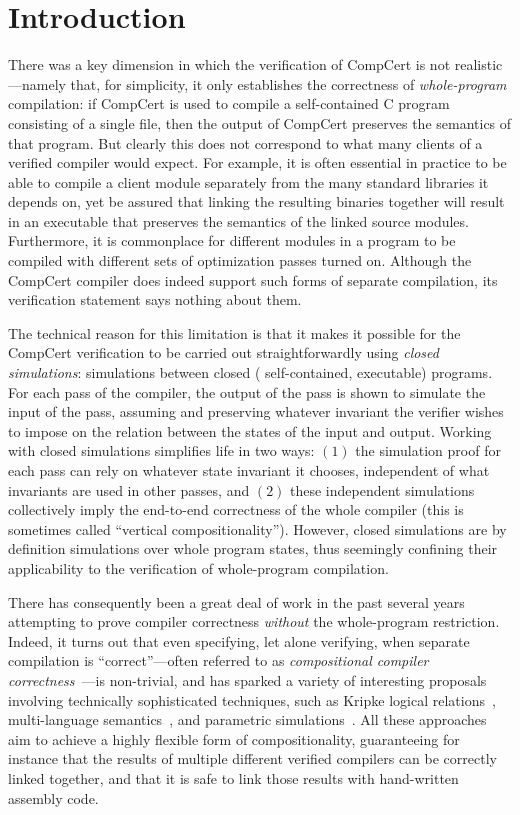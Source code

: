 \section{Introduction}
\label{sec:sepcomp:introduction}

There was a key dimension in which the verification of CompCert is not realistic---namely that, for
simplicity, it only establishes the correctness of \emph{whole-program} compilation: if CompCert is
used to compile a self-contained C program consisting of a single file, then the output of CompCert
preserves the semantics of that program.  But clearly this does not correspond to what many clients
of a verified compiler would expect.  For example, it is often essential in practice to be able to
compile a client module separately from the many standard libraries it depends on, yet be assured
that linking the resulting binaries together will result in an executable that preserves the
semantics of the linked source modules.  Furthermore, it is commonplace for different modules in a
program to be compiled with different sets of optimization passes turned on.  Although the CompCert
compiler does indeed support such forms of separate compilation, its verification statement says
nothing about them.

The technical reason for this limitation is that it makes it possible for the CompCert verification
to be carried out straightforwardly using \emph{closed simulations}: simulations between closed (\ie
self-contained, executable) programs.    For each pass of the
compiler, the output of the pass is shown to simulate the input of the pass, assuming and preserving
whatever invariant the verifier wishes to impose on the relation between the states of the input and
output.  Working with closed simulations simplifies life in two ways: $(1)$ the simulation proof for
each pass can rely on whatever state invariant it chooses, independent of what invariants are used
in other passes, and $(2)$ these independent simulations collectively imply the end-to-end
correctness of the whole compiler (this is sometimes called ``vertical compositionality'').
However, closed simulations are by definition simulations over whole program states, thus seemingly
confining their applicability to the verification of whole-program compilation.

There has consequently been a great deal of work in the past several
years attempting to prove compiler correctness \emph{without} the
whole-program restriction.  Indeed, it turns out that even specifying,
let alone verifying, when separate compilation is ``correct''---often
referred to as \emph{compositional compiler
  correctness}~\cite{benton+:icfp09}---is non-trivial, and has sparked
a variety of interesting proposals involving technically sophisticated
techniques, such as Kripke logical relations~\cite{hur+:popl11},
multi-language semantics~\cite{perconti+:esop14}, and parametric
simulations~\cite{hur+:popl12,neis+:icfp15}.  All these approaches aim
to achieve a highly flexible form of compositionality, guaranteeing
for instance that the results of multiple different verified compilers
can be correctly linked together, and that it is safe to link those
results with hand-written assembly code.

